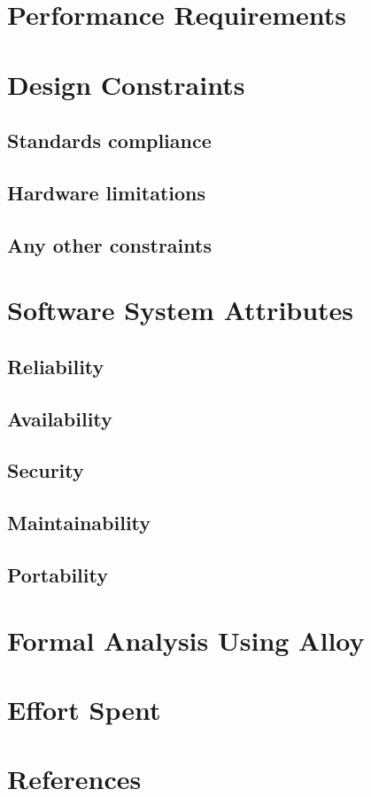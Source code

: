 \section{Performance Requirements}

\section{Design Constraints}

\subsection{Standards compliance}

\subsection{Hardware limitations}

\subsection{Any other constraints}

\section{Software System Attributes}

\subsection{Reliability}

\subsection{Availability}

\subsection{Security}

\subsection{Maintainability}

\subsection{Portability}

\section{Formal Analysis Using Alloy}

\section{Effort Spent}

\section{References}